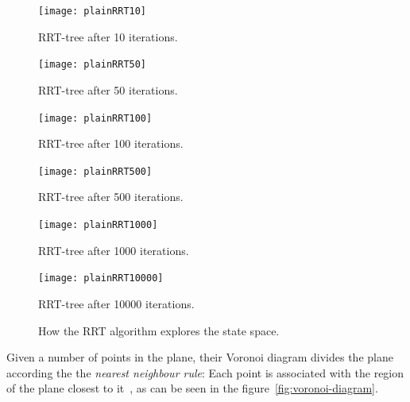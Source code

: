 \begin{figure}
  \centering
  \begin{minipage}[b]{0.3\textwidth}
    \texttt{[image: plainRRT10]}
    \caption{RRT-tree after 10 iterations.}
  \end{minipage}
  \begin{minipage}[b]{0.3\textwidth}
    \texttt{[image: plainRRT50]}
    \caption{RRT-tree after 50 iterations.}
  \end{minipage}
  \begin{minipage}[b]{0.3\textwidth}
    \texttt{[image: plainRRT100]}
    \caption{RRT-tree after 100 iterations.}
  \end{minipage}
  \newline %
  \begin{minipage}[b]{0.3\textwidth}
    \texttt{[image: plainRRT500]}
    \caption{RRT-tree after 500 iterations.}
  \end{minipage}
  \begin{minipage}[b]{0.3\textwidth}
    \texttt{[image: plainRRT1000]}
    \caption{RRT-tree after 1000 iterations.}
  \end{minipage}
  \begin{minipage}[b]{0.3\textwidth}
    \texttt{[image: plainRRT10000]}
    \caption{RRT-tree after 10000 iterations.}
  \end{minipage}
  \caption{How the \ac{RRT} algorithm explores the state space.}
  \label{fig:rrt-expansion}
\end{figure}

Given a number of points in the plane, their Voronoi diagram divides the plane
according the the \textit{nearest neighbour rule}: Each point is associated with
the region of the plane closest to
it~\cite{aurenhammerVoronoiDiagramsSurvey1991}, as can be seen in the
figure~\ref{fig:voronoi-diagram}.

